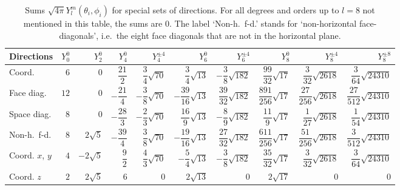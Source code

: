 \documentclass[\mydriver,12pt,twoside,notitlepage,a4paper]{article}
\begin{document}
\begin{table}[htb]
  \renewcommand{\arraystretch}{2.3}
  \centering
  \caption{Sums $\sqrt{4\pi}Y_l^m(\theta_i,\phi_i)$ for special
    sets of directions.
    For all degrees and orders up to $l=8$ not mentioned in this table,
    the sums are $0$.
    The label `Non-h.~f-d.' stands for `non-horizontal face-diagonals',
    i.e.~the eight face diagonals that are not in the horizontal plane.
  }
  \label{Tab-Ylm-sums}
  \footnotesize
  \begin{tabular}{lr@{\qquad}r@{\qquad}rr@{\qquad}rr@{\qquad}rrr}
  \toprule
    Directions   & $Y_0^0$   & $Y_2^0$      & $Y_4^0$          & $Y_4^{\pm4}$             & $Y_6^0$                    & $Y_6^{\pm4}$                & $Y_8^0$                     & $Y_8^{\pm4}$                 & $Y_8^{\pm8}$                  \\
  \midrule
    Coord.       &  $6$      & $0$          &  $\dfrac{21}{2}$ &  $\dfrac{3}{4}\sqrt{70}$ &  $\dfrac{3}{4}\sqrt{13}$   & $-\dfrac{3}{8}\sqrt{182}$   & $\dfrac{99}{32}\sqrt{17}$   & $\dfrac{3}{32}\sqrt{2618}$   & $\dfrac{3}{64}\sqrt{24310}$   \\
    Face diag.   & $12$      & $0$          & $-\dfrac{21}{4}$ & $-\dfrac{3}{8}\sqrt{70}$ & $-\dfrac{39}{16}\sqrt{13}$ &  $\dfrac{39}{32}\sqrt{182}$ & $\dfrac{891}{256}\sqrt{17}$ & $\dfrac{27}{256}\sqrt{2618}$ & $\dfrac{27}{512}\sqrt{24310}$ \\
    Space diag.  &  $8$      & $0$          & $-\dfrac{28}{3}$ & $-\dfrac{2}{3}\sqrt{70}$ & $\dfrac{16}{9}\sqrt{13}$  & $-\dfrac{8}{9}\sqrt{182}$   & $\dfrac{11}{9}\sqrt{17}$    & $\dfrac{1}{27}\sqrt{2618}$   & $\dfrac{1}{54}\sqrt{24310}$   \\
  \midrule
    Non-h.~f-d.  &  $8$      & $2\sqrt{5}$  & $-\dfrac{39}{4}$ &  $\dfrac{3}{8}\sqrt{70}$ & $-\dfrac{19}{16}\sqrt{13}$ & $\dfrac{27}{32}\sqrt{182}$  & $\dfrac{611}{256}\sqrt{17}$ & $\dfrac{51}{256}\sqrt{2618}$ & $\dfrac{3}{512}\sqrt{24310}$  \\
    Coord.
    $x$, $y$     &  $4$      & $-2\sqrt{5}$ & $\dfrac{9}{2}$   &  $\dfrac{4}{3}\sqrt{70}$ & $-\dfrac{5}{4}\sqrt{13}$   & $-\dfrac{3}{8}\sqrt{182}$   & $\dfrac{35}{32}\sqrt{17}$   & $\dfrac{3}{32}\sqrt{2618}$   & $\dfrac{3}{64}\sqrt{24310}$   \\
    Coord. $z$   &  $2$      & $2\sqrt{5}$  & $6$              &  $0$                     & $2\sqrt{13}$               & $0$                         & $2\sqrt{17}$                & $0$                          & $0$                           \\
  \bottomrule
  \end{tabular}
\end{table}
\end{document}
